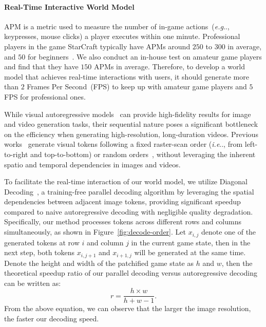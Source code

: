 \documentclass{article} %
\makeatletter
\DeclareRobustCommand\onedot{\futurelet\@let@token\@onedot}
\def\@onedot{\ifx\@let@token.\else.\null\fi\xspace}
\def\eg{\emph{e.g}\onedot} \def\Eg{\emph{E.g}\onedot}
\def\ie{\emph{i.e}\onedot} \def\Ie{\emph{I.e}\onedot}
\makeatother
\begin{document}
\paragraph{Real-Time Interactive World Model}
APM is a metric used to measure the number of in-game actions~(\eg, keypresses, mouse clicks) a player executes within one minute. Professional players in the game StarCraft typically have APMs around $250$ to $300$ in average, and $50$ for beginners~\citep{wikipedia:apm}. We also conduct an in-house test on amateur game players and find that they have $150$ APMs in average. Therefore, to develop a world model that achieves real-time interactions with users, it should generate more than $2$ Frames Per Second~(FPS) to keep up with amateur game players and $5$ FPS for professional ones.

While visual autoregressive models~\citep{liu2024elucidating, yu2023language, kondratyuk2023videopoet} can provide high-fidelity results for image and video generation tasks, their sequential nature poses a significant bottleneck on the efficiency when generating high-resolution, long-duration videos. Previous works~\citep{bai2024sequential, yu2023language} generate visual tokens following a fixed raster-scan order (\ie, from left-to-right and top-to-bottom) or random orders~\citep{chang2022maskgit,yu2024randomized}, without leveraging the inherent spatio and temporal dependencies in images and videos.

To facilitate the real-time interaction of our world model, we utilize Diagonal Decoding~\citep{ye2025fast}, a training-free parallel decoding algorithm by leveraging the spatial dependencies between adjacent image tokens, providing significant speedup compared to naive autoregressive decoding with negligible quality degradation. Specifically, our method processes tokens across different rows and columns simultaneously, as shown in Figure~\ref{fig:decode-order}. Let $x_{i,j}$ denote one of the generated tokens at row $i$ and column $j$ in the current game state, then in the next step, both tokens $x_{i,j+1}$ and $x_{i+1,j}$ will be generated at the same time. Denote the height and width of the patchified game state as $h$ and $w$, then the theoretical speedup ratio of our parallel decoding versus autoregressive decoding can be written as:
\begin{equation}
  r = \frac{h \times w}{h+w-1}.
  \label{eq:accelerate ratio}
\end{equation}
From the above equation, we can observe that the larger the image resolution, the faster our decoding speed. 
\end{document}
